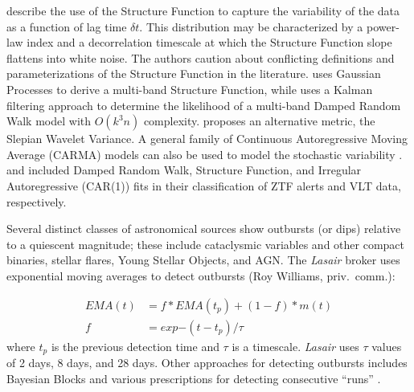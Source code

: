 \documentclass[DM,authoryear,toc]{lsstdoc}
\begin{document}
\citep[and references therein]{Kozowski:16:StructureFunction} describe the use of the Structure Function to capture the variability of the data as a function of lag time $\delta t$.
This distribution may be characterized by a power-law index and a decorrelation timescale at which the Structure Function slope flattens into white noise.
The authors caution about conflicting definitions and parameterizations of the Structure Function in the literature. %
\citep{Hernitschek:16:PS1SF} uses Gaussian Processes to derive a multi-band Structure Function, while \citet{Hu:20:MultibandDRW} uses a Kalman filtering approach to determine the likelihood of a multi-band Damped Random Walk model with $O(k^3n)$ complexity.
\citep{Graham:14:SlepianWavelets} proposes an alternative metric, the Slepian Wavelet Variance.
A general family of Continuous Autoregressive Moving Average (CARMA) models can also be used to model the stochastic variability \citep[and references therein]{Moreno:19:AGNVariabilityHandbook}.
\citet{Sanchez-Saez:21:AlertClassification} and \citet{De-Cicco:21:AGNSelection} included Damped Random Walk, Structure Function, and Irregular Autoregressive (CAR(1)) fits in their classification of ZTF alerts and VLT data, respectively.


Several distinct classes of astronomical sources show outbursts (or dips) relative to a quiescent magnitude; these include cataclysmic variables and other compact binaries, stellar flares, Young Stellar Objects, and AGN.
The \textit{Lasair} broker uses exponential moving averages to detect outbursts (Roy Williams, priv.\ comm.):

\begin{equation}
  \begin{aligned}
    EMA(t) & = f*EMA(t_p) + (1-f)*m(t) \\
    f &= exp{-(t-t_p)/\tau}
  \end{aligned}
\end{equation}
where $t_p$ is the previous detection time and $\tau$ is a timescale.  
\textit{Lasair} uses $\tau$ values of  2 days, 8 days, and 28 days.
Other approaches for detecting outbursts includes Bayesian Blocks \citep{Scargle:13:BayesianBlocks} and various prescriptions for detecting consecutive ``runs'' \citep[e.g.,][]{Chang:15:StellarFlares}.
\end{document}
